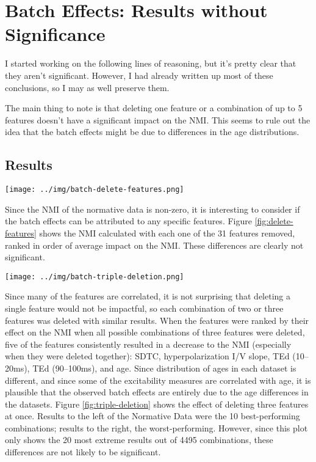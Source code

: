 \documentclass[12pt]{article}
\begin{document}
\section*{Batch Effects: Results without Significance}

I started working on the following lines of reasoning, but it's pretty clear that they aren't significant. However, I had already written up most of these conclusions, so I may as well preserve them.

The main thing to note is that deleting one feature or a combination of up to 5 features doesn't have a significant impact on the NMI. This seems to rule out the idea that the batch effects might be due to differences in the age distributions.

\subsection*{Results}

\begin{figure*}
  \centering
       \texttt{[image: ../img/batch-delete-features.png]}
         \caption{}
  \label{fig:delete-features}
\end{figure*}

Since the NMI of the normative data is non-zero, it is interesting to consider if the batch effects can be attributed to any specific features. Figure \ref{fig:delete-features} shows the NMI calculated with each one of the 31 features removed, ranked in order of average impact on the NMI. These differences are clearly not significant.

\pagebreak

\begin{figure*}
  \centering
       \texttt{[image: ../img/batch-triple-deletion.png]}
         \caption{}
  \label{fig:triple-deletion}
\end{figure*}

Since many of the features are correlated, it is not surprising that deleting a single feature would not be impactful, so each combination of two or three features was deleted with similar results. When the features were ranked by their effect on the NMI when all possible combinations of three features were deleted, five of the features consistently resulted in a decrease to the NMI (especially when they were deleted together): SDTC, hyperpolarization I/V slope, TEd (10–20ms), TEd (90–100ms), and age. Since distribution of ages in each dataset is different, and since some of the excitability measures are correlated with age, %
it is plausible that the observed batch effects are entirely due to the age differences in the datasets. Figure \ref{fig:triple-deletion} shows the effect of deleting three features at once. Results to the left of the Normative Data were the 10 best-performing combinations; results to the right, the worst-performing. However, since this plot only shows the 20 most extreme results out of 4495 combinations, these differences are not likely to be significant.
\end{document}
